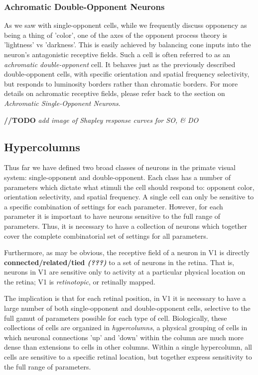 \documentclass[journal,onecolumn]{IEEEtran}
\begin{document}
\subsubsection*{Achromatic Double-Opponent Neurons}

As we saw with single-opponent cells, while we frequently discuss opponency as being a thing of 'color', one of the axes of the opponent process theory is 'lightness' vs 'darkness'. This is easily achieved by balancing cone inputs into the neuron's antagonistic receptive fields. Such a cell is often referred to as an \textit{achromatic double-opponent} cell. It behaves just as the previously described double-opponent cells, with specific orientation and spatial frequency selectivity, but responds to luminosity borders rather than chromatic borders. For more details on achromatic receptive fields, please refer back to the section on \textit{Achromatic Single-Opponent Neurons}.

\textbf{//TODO} \textit{add image of Shapley response curves for SO, \& DO}

\subsection*{Hypercolumns}

Thus far we have defined two broad classes of neurons in the primate visual system: single-opponent and double-opponent. Each class has a number of parameters which dictate what stimuli the cell should respond to: opponent color, orientation selectivity, and spatial frequency. A single cell can only be sensitive to a specific combination of settings for each parameter. However, for each parameter it is important to have neurons sensitive to the full range of parameters. Thus, it is necessary to have a collection of neurons which together cover the complete combinatorial set of settings for all parameters.

Furthermore, as may be obvious, the receptive field of a neuron in V1 is directly \textbf{connected/related/tied \textit{(???)}} to a set of neurons in the retina. That is, neurons in V1 are sensitive only to activity at a particular physical location on the retina; V1 is \textit{retinotopic}, or retinally mapped.

The implication is that for each retinal position, in V1 it is necessary to have a large number of both single-opponent and double-opponent cells, selective to the full gamut of parameters possible for each type of cell. Biologically, these collections of cells are organized in \textit{hypercolumns}, a physical grouping of cells in which neuronal connections 'up' and 'down' within the column are much more dense than extensions to cells in other columns. Within a single hypercolumn, all cells are sensitive to a specific retinal location, but together express sensitivity to the full range of parameters.
\end{document}
